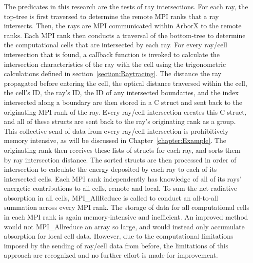 
The predicates in this research are the tests of ray intersections. For each ray, the top-tree is first traversed to determine the remote MPI ranks that a ray intersects.  Then, the rays are MPI communicated within ArborX to the remote ranks. Each MPI rank then conducts a traversal of the bottom-tree to determine the computational cells that are intersected by each ray. For every ray/cell intersection that is found, a callback function is invoked to calculate the intersection characteristics of the ray with the cell using the trigonometric calculations defined in section~\ref{section:Raytracing}. The distance the ray propagated before entering the cell, the optical distance traversed within the cell, the cell's ID, the ray's ID, the ID of any intersected boundaries, and the index intersected along a boundary are then stored in a C struct and sent back to the originating MPI rank of the ray.
Every ray/cell intersection creates this C struct, and all of these structs are sent back to the ray's originating rank as a group. This collective send of data from every ray/cell intersection is prohibitively memory intensive, as will be discussed in Chapter~\ref{chapter:Example}. The originating rank then receives these lists of structs for each ray, and sorts them by ray intersection distance. The sorted structs are then processed in order of intersection to calculate the energy deposited by each ray to each of its intersected cells. Each MPI rank independently has knowledge of all of its rays' energetic contributions to all cells, remote and local. To sum the net radiative absorption in all cells, MPI\_AllReduce is called to conduct an all-to-all summation across every MPI rank. The storage of data for all computational cells in each MPI rank is again memory-intensive and inefficient. An improved method would not MPI\_Allreduce an array so large, and would instead only accumulate absorption for local cell data. However, due to the computational limitations imposed by the sending of ray/cell data from before, the limitations of this approach are recognized and no further effort is made for improvement.

